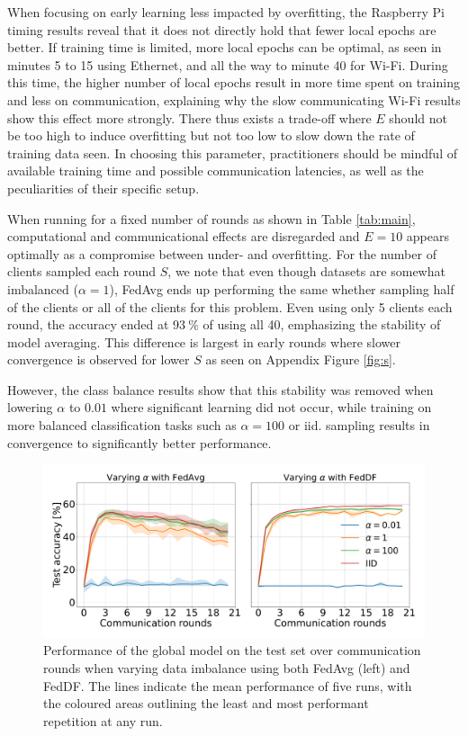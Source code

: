\documentclass{article}
\newcommand{\unit}[1]{\ensuremath{\:\text{#1}}}
\newcommand{\pro}{\ensuremath{\unit{\%{}}}}
\begin{document}
When focusing on early learning less impacted by overfitting, the Raspberry Pi timing results reveal that it does not directly hold that fewer local epochs are better.
If training time is limited, more local epochs can be optimal, as seen in minutes 5 to 15 using Ethernet, and all the way to minute 40 for Wi-Fi.
During this time, the higher number of local epochs result in more time spent on training and less on communication, explaining why the slow communicating Wi-Fi results show this effect more strongly.
There thus exists a trade-off where $E$ should not be too high to induce overfitting but not too low to slow down the rate of training data seen.
In choosing this parameter, practitioners should be mindful of available training time and possible communication latencies, as well as the peculiarities of their specific setup.

When running for a fixed number of rounds as shown in Table \ref{tab:main}, computational and communicational effects are disregarded and $E=10$ appears optimally as a compromise between under- and overfitting.
For the number of clients sampled each round $S$, we note that even though datasets are somewhat imbalanced ($\alpha=1$), FedAvg ends up performing the same whether sampling half of the clients or all of the clients for this problem.
Even using only 5 clients each round, the accuracy ended at $93 \pro$ of using all 40, emphasizing the stability of model averaging.
This difference is largest in early rounds where slower convergence is observed for lower $S$ as seen on Appendix Figure \ref{fig:s}.

However, the class balance results show that this stability was removed when lowering $\alpha$ to $0.01$ where significant learning did not occur, while training on more balanced classification tasks such as $\alpha=100$ or iid. sampling results in convergence to significantly better performance.

\begin{figure}[H]
    \centering
         \includegraphics[width=\linewidth]{imgs/feddf-alpha.pdf}
    \caption{
    Performance of the global model on the test set over communication rounds when varying data imbalance using both FedAvg (left) and FedDF.
    The lines indicate the mean performance of five runs, with the coloured areas outlining the least and most performant repetition at any run.
    }
    \label{fig:alpha}
\end{figure}\noindent
\end{document}
